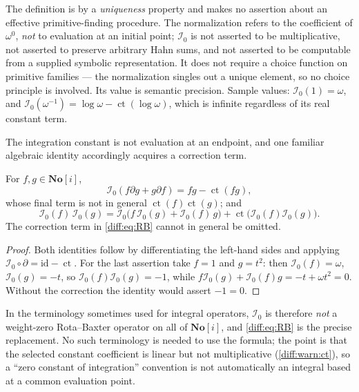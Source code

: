 \documentclass[11pt,letterpaper]{article}
\numberwithin{equation}{section}
\theoremstyle{definition}
\theoremstyle{remark}
\newcommand{\SC}{\mathbf{No}[i]}
\newcommand{\der}{\partial}
\newcommand{\Izero}{\mathcal I_{0}}
\newcommand{\ct}{\operatorname{ct}}
\begin{document}
\begin{warning}[$\Izero$ is a normalization, not an algorithm]
\label{diff:warn:Jnotalgorithm}
The definition is by a \emph{uniqueness} property and makes no assertion about
an effective primitive-finding procedure. The normalization refers to the
coefficient of $\omega^{0}$, \emph{not} to evaluation at an initial point;
$\Izero$ is not asserted to be multiplicative, not asserted to preserve
arbitrary Hahn sums, and not asserted to be computable from a supplied symbolic
representation. It does not require a choice function on primitive families
--- the normalization singles out a unique element, so no choice principle is
involved. Its value is semantic precision. Sample values:
$\Izero(1)=\omega$, and $\Izero(\omega^{-1})=\log\omega-\ct(\log\omega)$,
which is infinite regardless of its real constant term.
\end{warning}

The integration constant is not evaluation at an endpoint, and one familiar
algebraic identity accordingly acquires a correction term.

\begin{proposition}
\label{diff:prop:RB}
For $f,g\in\SC$,
\begin{equation}\label{diff:eq:parts}
 \Izero(f\der g+g\der f)=fg-\ct(fg),
\end{equation}
whose final term is not in general $\ct(f)\ct(g)$; and
\begin{equation}\label{diff:eq:RB}
 \Izero(f)\,\Izero(g)=\Izero\bigl(f\,\Izero(g)+\Izero(f)\,g\bigr)
 +\ct\bigl(\Izero(f)\Izero(g)\bigr).
\end{equation}
The correction term in \cref{diff:eq:RB} cannot in general be omitted.
\end{proposition}
\begin{proof}
Both identities follow by differentiating the left-hand sides and applying
$\Izero\circ\der=\mathrm{id}-\ct$. For the last assertion take $f=1$ and
$g=t^{2}$: then $\Izero(f)=\omega$, $\Izero(g)=-t$, so
$\Izero(f)\Izero(g)=-1$, while
$f\Izero(g)+\Izero(f)g=-t+\omega t^{2}=0$. Without the correction the identity
would assert $-1=0$.
\end{proof}

In the terminology sometimes used for integral operators, $\Izero$ is
therefore \emph{not} a weight-zero Rota--Baxter operator on all of $\SC$, and
\cref{diff:eq:RB} is the precise replacement. No such terminology is needed to
use the formula; the point is that the selected constant coefficient is linear
but not multiplicative (\cref{diff:warn:ct}), so a ``zero constant of
integration'' convention is not automatically an integral based at a common
evaluation point.
\end{document}
